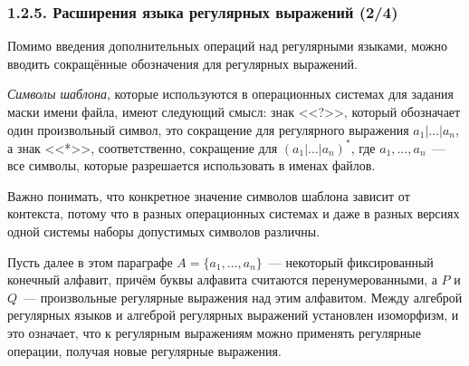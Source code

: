\documentclass[mathserif,12pt,aspectratio=169]{beamer}
\renewcommand{\index}[1]{}
\def\odmkey#1#2{{\it\color{red} #1}\index{#2}}
\def\Tuple#1#2#3{{#1}_{#2},\dots,{#1}_{#3}}
\begin{document}
\begin{frame}
\frametitle{1.2.5. Расширения языка регулярных выражений (2/4)}

Помимо введения дополнительных операций над регулярными языками, 
можно вводить сокращённые обозначения для регулярных выражений.

\begin{example}
\odmkey{Символы шаблона}{Символ!шаблона}, которые используются в операционных
системах для задания маски имени файла, имеют следующий смысл:
знак <<?>>, который обозначает один произвольный символ, это сокращение
для регулярного выражения $a_1 | \dots | a_n$,
а знак <<*>>, соответственно, сокращение для
$(a_1 | \dots | a_n)^*$, где
$\Tuple{a}{1}{n}$~--- все символы, которые разрешается использовать
в именах файлов.
\end{example}

\begin{remark}
Важно понимать, что конкретное значение
символов шаблона зависит от контекста,
потому что в разных операционных системах и даже
в разных версиях одной системы наборы допустимых символов различны.
\end{remark}

\smallskip
Пусть далее в этом параграфе $A=\{\Tuple{a}{1}{n}\}$~--- некоторый фиксированный конечный алфавит, причём буквы 
алфавита считаются перенумерованными, а $P$ и $Q$~--- произвольные регулярные 
выражения над этим алфавитом. Между алгеброй регулярных языков и алгеброй 
регулярных выражений установлен изоморфизм, и это означает, что к регулярным выражениям можно применять регулярные операции, получая новые регулярные выражения.        

\end{frame}
\end{document}
